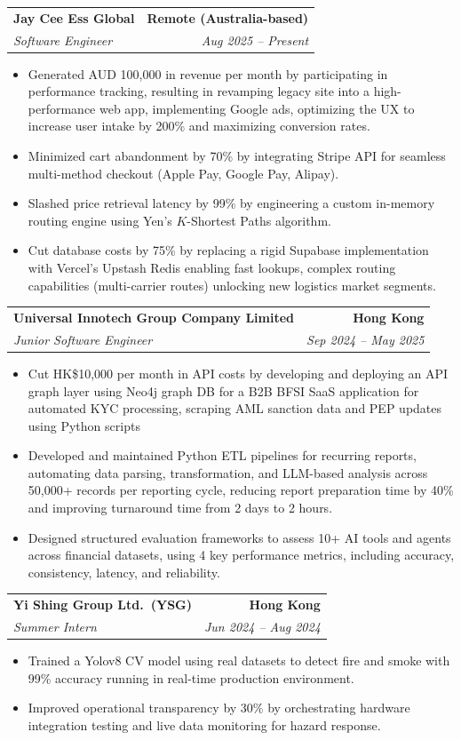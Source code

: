 \documentclass[9pt,a4paper]{article}
\makeatletter
\newcommand{\resumeSubheading}[4]{%
  \vspace{0.6em}%
  \begin{tabular*}{\textwidth}{l@{\extracolsep{\fill}}r}
    \textbf{#1} & \textbf{#2} \\
    \textit{\small #3} & \textit{\small #4} \\
  \end{tabular*}\vspace{0.32em}}
\makeatother
\begin{document}
\resumeSubheading{Jay Cee Ess Global}{Remote (Australia-based)}{Software Engineer}{Aug 2025 -- Present}
\begin{itemize}
  \item Generated AUD 100{,}000 in revenue per month by participating in performance tracking, resulting in revamping legacy site into a high-performance web app, implementing Google ads, optimizing the UX to increase user intake by 200\% and maximizing conversion rates.
  \item Minimized cart abandonment by 70\% by integrating Stripe API for seamless multi-method checkout (Apple Pay, Google Pay, Alipay).
  \item Slashed price retrieval latency by 99\% by engineering a custom in-memory routing engine using Yen's $K$-Shortest Paths algorithm.
  \item Cut database costs by 75\% by replacing a rigid Supabase implementation with Vercel's Upstash Redis enabling fast lookups, complex routing capabilities (multi-carrier routes) unlocking new logistics market segments.
\end{itemize}

\resumeSubheading{Universal Innotech Group Company Limited}{Hong Kong}{Junior Software Engineer}{Sep 2024 -- May 2025}
\begin{itemize}
  \item Cut HK\$10{,}000 per month in API costs by developing and deploying an API graph layer using Neo4j graph DB for a B2B BFSI SaaS application for automated KYC processing, scraping AML sanction data and PEP updates using Python scripts
  \item Developed and maintained Python ETL pipelines for recurring reports, automating data parsing, transformation, and LLM-based analysis across 50{,}000+ records per reporting cycle, reducing report preparation time by 40\% and improving turnaround time from 2 days to 2 hours.
  \item Designed structured evaluation frameworks to assess 10+ AI tools and agents across financial datasets, using 4 key performance metrics, including accuracy, consistency, latency, and reliability.
\end{itemize}

\resumeSubheading{Yi Shing Group Ltd.\ (YSG)}{Hong Kong}{Summer Intern}{Jun 2024 -- Aug 2024}
\begin{itemize}
  \item Trained a Yolov8 CV model using real datasets to detect fire and smoke with 99\% accuracy running in real-time production environment.
  \item Improved operational transparency by 30\% by orchestrating hardware integration testing and live data monitoring for hazard response.
\end{itemize}
\end{document}
